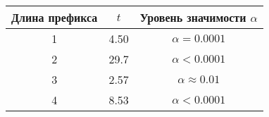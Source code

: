 \begin{tabular}{|c|c|c|}
	\hline
	Длина префикса & $t$ & Уровень значимости $\alpha$\\
	\hline
	1 & 4.50 &  $\alpha = 0.0001$\\
	\hline
	2 & 29.7 & $\alpha < 0.0001$ \\
	\hline
	3 & 2.57 & $\alpha \approx 0.01$ \\
	\hline
	4 & 8.53 & $\alpha < 0.0001$ \\
	\hline
\end{tabular}



















































